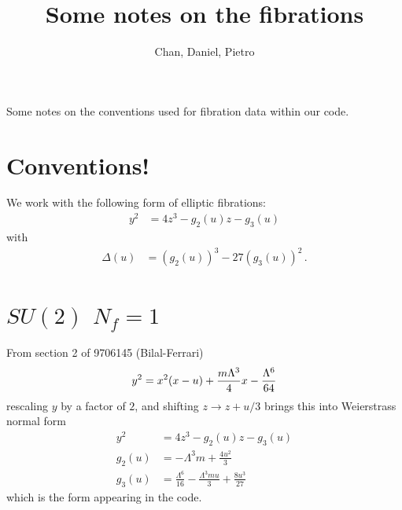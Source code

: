 \documentclass[11pt]{article}
\title{Some notes on the fibrations}
\author{Chan, Daniel, Pietro}
\newcommand{\be}{\begin{equation}}
\newcommand{\ee}{\end{equation}}
\begin{document}
\maketitle
\begin{center}
	Some notes on the conventions used for fibration data within our code.
\end{center}
\tableofcontents

\section{Conventions!}
We work with the following form of elliptic fibrations:
\be
\begin{split}
	y^{2} & = 4z^{3} - g_{2}(u) z - g_{3}(u) 
\end{split}
\ee
with
\be
\begin{split}
	\Delta(u) & = (g_{2}(u))^{3} - 27 (g_{3}(u))^{2}\,.
\end{split}
\ee


\section{$SU(2)$ $N_{f}=1$}

From section 2 of 9706145 (Bilal-Ferrari)
\be
	y^{2} = x^{2}(x-u) + {m \Lambda^{3}\over 4} x - {\Lambda^{6}\over 64}
\ee
rescaling $y$ by a factor of $2$, and shifting $z \to z + u/3$ brings this into Weierstrass normal form
\be
\begin{split}
	y^{2} & = 4z^{3} - g_{2}(u) z - g_{3}(u) \\
	g_{2}(u) & = -\Lambda ^3 m+\frac{4 u^2}{3}\\
	g_{3}(u) & = \frac{\Lambda ^6}{16}-\frac{ \Lambda ^3 m u}{3} +\frac{8 u^3}{27}
\end{split}
\ee
which is the form appearing in the code.

\begin{comment}
From section 10.2 of GMN2
\be
	\lambda^{2} = \left( {\Lambda^{2} \over z^{3}} + {3 u\over z^{2}} + {2 m \Lambda^{} \over z^{}} + \Lambda^{2} \right)\, dz^{2}
\ee
upon a proper ($z$-dependent) rescaling od $\Lambda$, we may identify the elliptic curve
\be
	y^{2} = 4z^{3} + {8m\over \Lambda}z^{2}+{12 u\over \Lambda^{2}} z + 4
\ee
shifting $z \to z - 2m / 3\Lambda$ brings this into Weierstrass normal form
\be
\begin{split}
	y^{2} & = 4z^{3} - g_{2}(u) z - g_{3}(u) \\
	g_{2}(u) & = {16 m^{2} \over 3\Lambda^{2}} - {12 u \over \Lambda^{2}} \\
	g_{3}(u) & = {8 m u \over \Lambda^{3}} - {64 m^{3} \over 27 \Lambda^{3}} 
\end{split}
\ee
which is the form appearing in the code.
\end{comment}
\end{document}
